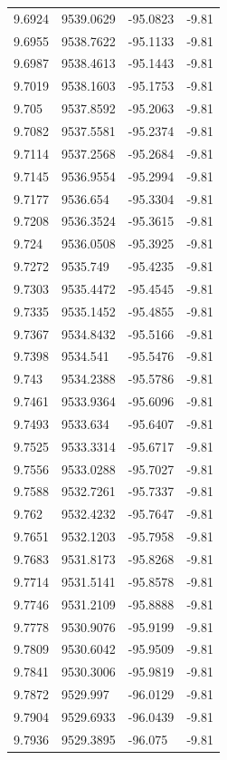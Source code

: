 \begin{table}[H]
\begin{tabular}{llll}
9.6924 & 9539.0629 & -95.0823 & -9.81 \\
9.6955 & 9538.7622 & -95.1133 & -9.81 \\
9.6987 & 9538.4613 & -95.1443 & -9.81 \\
9.7019 & 9538.1603 & -95.1753 & -9.81 \\
9.705 & 9537.8592 & -95.2063 & -9.81 \\
9.7082 & 9537.5581 & -95.2374 & -9.81 \\
9.7114 & 9537.2568 & -95.2684 & -9.81 \\
9.7145 & 9536.9554 & -95.2994 & -9.81 \\
9.7177 & 9536.654 & -95.3304 & -9.81 \\
9.7208 & 9536.3524 & -95.3615 & -9.81 \\
9.724 & 9536.0508 & -95.3925 & -9.81 \\
9.7272 & 9535.749 & -95.4235 & -9.81 \\
9.7303 & 9535.4472 & -95.4545 & -9.81 \\
9.7335 & 9535.1452 & -95.4855 & -9.81 \\
9.7367 & 9534.8432 & -95.5166 & -9.81 \\
9.7398 & 9534.541 & -95.5476 & -9.81 \\
9.743 & 9534.2388 & -95.5786 & -9.81 \\
9.7461 & 9533.9364 & -95.6096 & -9.81 \\
9.7493 & 9533.634 & -95.6407 & -9.81 \\
9.7525 & 9533.3314 & -95.6717 & -9.81 \\
9.7556 & 9533.0288 & -95.7027 & -9.81 \\
9.7588 & 9532.7261 & -95.7337 & -9.81 \\
9.762 & 9532.4232 & -95.7647 & -9.81 \\
9.7651 & 9532.1203 & -95.7958 & -9.81 \\
9.7683 & 9531.8173 & -95.8268 & -9.81 \\
9.7714 & 9531.5141 & -95.8578 & -9.81 \\
9.7746 & 9531.2109 & -95.8888 & -9.81 \\
9.7778 & 9530.9076 & -95.9199 & -9.81 \\
9.7809 & 9530.6042 & -95.9509 & -9.81 \\
9.7841 & 9530.3006 & -95.9819 & -9.81 \\
9.7872 & 9529.997 & -96.0129 & -9.81 \\
9.7904 & 9529.6933 & -96.0439 & -9.81 \\
9.7936 & 9529.3895 & -96.075 & -9.81 \\

\end{tabular}
\end{table}
